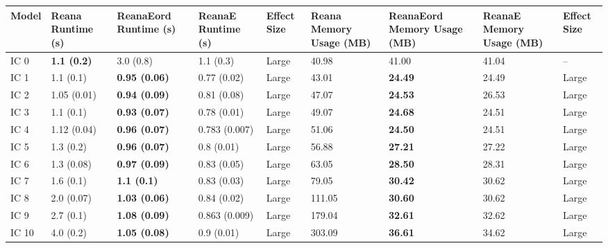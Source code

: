 \begin{tabular}{lllllllll}
\toprule
Model &  Reana Runtime (s) & ReanaEord Runtime (s) & ReanaE Runtime (s) & Effect Size & Reana Memory Usage (MB) & ReanaEord Memory Usage (MB) & ReanaE Memory Usage (MB) & Effect Size \\
\midrule
 IC 0 & \textbf{1.1 (0.2)} &             3.0 (0.8) &          1.1 (0.3) &       Large &                   40.98 &                       41.00 &                    41.04 &          -- \\
 IC 1 &          1.1 (0.1) &  \textbf{0.95 (0.06)} &        0.77 (0.02) &       Large &                   43.01 &              \textbf{24.49} &                    24.49 &       Large \\
 IC 2 &        1.05 (0.01) &  \textbf{0.94 (0.09)} &        0.81 (0.08) &       Large &                   47.07 &              \textbf{24.53} &                    26.53 &       Large \\
 IC 3 &          1.1 (0.1) &  \textbf{0.93 (0.07)} &        0.78 (0.01) &       Large &                   49.07 &              \textbf{24.68} &                    24.51 &       Large \\
 IC 4 &        1.12 (0.04) &  \textbf{0.96 (0.07)} &      0.783 (0.007) &       Large &                   51.06 &              \textbf{24.50} &                    24.51 &       Large \\
 IC 5 &          1.3 (0.2) &  \textbf{0.96 (0.07)} &         0.8 (0.01) &       Large &                   56.88 &              \textbf{27.21} &                    27.22 &       Large \\
 IC 6 &         1.3 (0.08) &  \textbf{0.97 (0.09)} &        0.83 (0.05) &       Large &                   63.05 &              \textbf{28.50} &                    28.31 &       Large \\
 IC 7 &          1.6 (0.1) &    \textbf{1.1 (0.1)} &        0.83 (0.03) &       Large &                   79.05 &              \textbf{30.42} &                    30.62 &       Large \\
 IC 8 &         2.0 (0.07) &  \textbf{1.03 (0.06)} &        0.84 (0.02) &       Large &                  111.05 &              \textbf{30.60} &                    30.62 &       Large \\
 IC 9 &          2.7 (0.1) &  \textbf{1.08 (0.09)} &      0.863 (0.009) &       Large &                  179.04 &              \textbf{32.61} &                    32.62 &       Large \\
IC 10 &          4.0 (0.2) &  \textbf{1.05 (0.08)} &         0.9 (0.01) &       Large &                  303.09 &              \textbf{36.61} &                    34.62 &       Large \\

\end{tabular}
